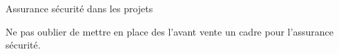 
Assurance sécurité dans les projets

Ne pas oublier de mettre en place des l'avant vente un cadre pour l'assurance sécurité.